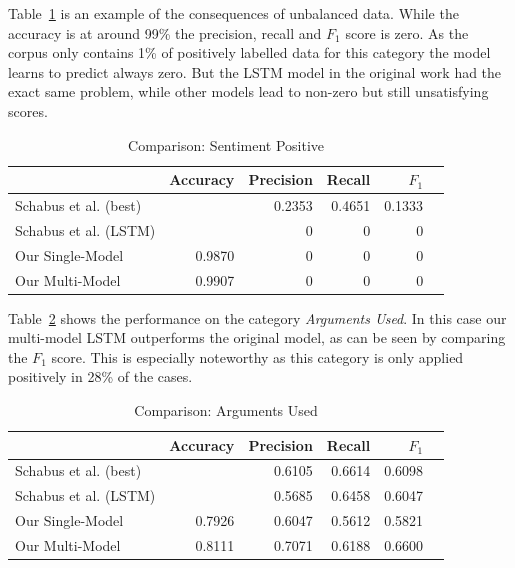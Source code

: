 \documentclass[11pt,a4paper]{article}
\begin{document}
Table~\ref{tab:results:sentiment_positive} is an example of the consequences of unbalanced data. While the accuracy is at around 99\% the precision, recall and $F_1$ score is zero. As the corpus only contains 1\% of positively labelled data for this category the model learns to predict always zero.
But the LSTM model in the original work had the exact same problem, while other models lead to non-zero but still unsatisfying scores.
\begin{table}[h!]
	\centering\scriptsize
	\begin{tabular}{l r r r r r}
		& Accuracy & Precision & Recall & $F_1$ \\
		\hline
		Schabus et al. (best) & & 0.2353 & 0.4651 & 0.1333 \\
		Schabus et al. (LSTM) & & 0 & 0 & 0\\
		\hline
		Our Single-Model & 0.9870 & 0 & 0 & 0 \\
		Our Multi-Model & 0.9907 & 0 & 0 & 0 \\
	\end{tabular}
	\caption{Comparison: Sentiment Positive}
	\label{tab:results:sentiment_positive}
\end{table}

Table~\ref{tab:results:arguments_used} shows the performance on the category \textit{Arguments Used}. In this case our multi-model LSTM outperforms the original model, as can be seen by comparing the $F_1$ score. This is especially noteworthy as this category is only applied positively in 28\% of the cases.  
\begin{table}[h!]
	\centering\scriptsize
	\begin{tabular}{l r r r r r}
		& Accuracy & Precision & Recall & $F_1$ \\
		\hline
		Schabus et al. (best) & & 0.6105 & 0.6614 & 0.6098 \\
		Schabus et al. (LSTM) & & 0.5685 & 0.6458 & 0.6047\\
		\hline
		Our Single-Model & 0.7926 & 0.6047 & 0.5612 & 0.5821 \\
		Our Multi-Model & 0.8111 & 0.7071 & 0.6188 & 0.6600 \\
	\end{tabular}
	\caption{Comparison: Arguments Used}
	\label{tab:results:arguments_used}
\end{table}
\end{document}
